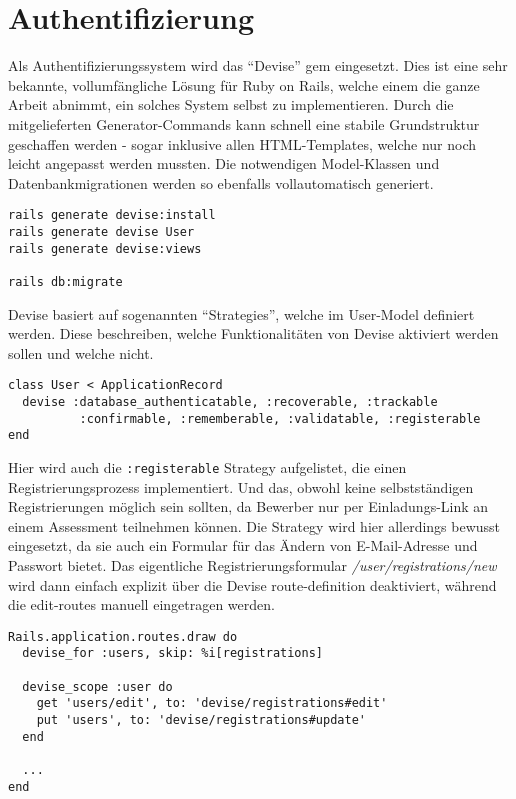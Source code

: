 
\section{Authentifizierung}

Als Authentifizierungssystem wird das \enquote{Devise} gem eingesetzt. Dies ist eine sehr bekannte, vollumfängliche Lösung für Ruby on Rails,
welche einem die ganze Arbeit abnimmt, ein solches System selbst zu implementieren. Durch die mitgelieferten Generator-Commands
kann schnell eine stabile Grundstruktur geschaffen werden - sogar inklusive allen HTML-Templates, welche nur noch leicht angepasst werden mussten. 
Die notwendigen Model-Klassen und Datenbankmigrationen werden so ebenfalls vollautomatisch generiert.

\begin{codebox}
\begin{verbatim}
rails generate devise:install
rails generate devise User
rails generate devise:views

rails db:migrate
\end{verbatim}
\end{codebox}

Devise basiert auf sogenannten \enquote{Strategies}, welche im User-Model definiert werden. Diese beschreiben,
welche Funktionalitäten von Devise aktiviert werden sollen und welche nicht.

\begin{codebox}
\begin{verbatim}
class User < ApplicationRecord
  devise :database_authenticatable, :recoverable, :trackable
          :confirmable, :rememberable, :validatable, :registerable
end
\end{verbatim}
\end{codebox}

Hier wird auch die \texttt{:registerable} Strategy aufgelistet, die einen Registrierungsprozess implementiert.
Und das, obwohl keine selbstständigen Registrierungen möglich sein sollten, da Bewerber nur per Einladungs-Link an einem Assessment teilnehmen können. 
Die Strategy wird hier allerdings bewusst eingesetzt, da sie auch ein Formular für das Ändern von E-Mail-Adresse und Passwort bietet. 
Das eigentliche Registrierungsformular \emph{/user/registrations/new} wird dann einfach explizit über die Devise route-definition deaktiviert, während
die edit-routes manuell eingetragen werden.

\begin{codebox}
\begin{verbatim}
Rails.application.routes.draw do
  devise_for :users, skip: %i[registrations]

  devise_scope :user do
    get 'users/edit', to: 'devise/registrations#edit'
    put 'users', to: 'devise/registrations#update'
  end

  ...
end
\end{verbatim}
\end{codebox}

